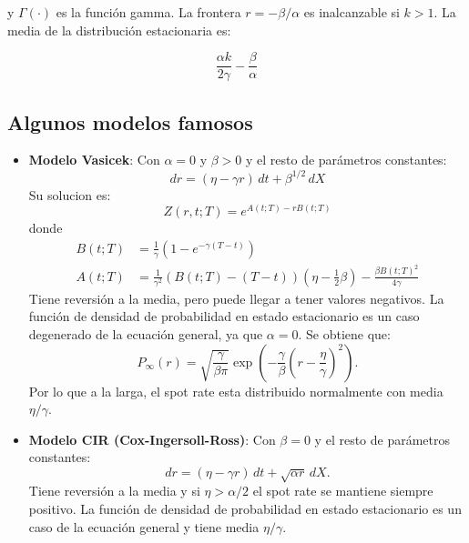 y $\Gamma(\cdot)$ es la función gamma. La frontera $r = -\beta/\alpha$ es inalcanzable si $k > 1$. La media de la distribución estacionaria es:

\begin{equation*}
    \frac{\alpha k}{2\gamma} - \frac{\beta}{\alpha}
\end{equation*}






\subsection{Algunos modelos famosos}
\begin{itemize}
    \item \textbf{Modelo Vasicek}: Con $\alpha=0$ y $\beta>0$ y el resto de parámetros constantes:
    \begin{equation*}
        \boxed{dr = (\eta - \gamma r)\,dt + \beta^{1/2}\,dX}
    \end{equation*}
    Su solucion es:
    \begin{equation*}
        Z(r, t; T) = e^{A(t;T) - r B(t;T)}
    \end{equation*}
    donde
    \begin{align*}
        B(t;T) &= \frac{1}{\gamma} \left( 1 - e^{-\gamma (T-t)} \right) \\
        A(t;T) &= \frac{1}{\gamma^2} \left( B(t;T) - (T-t) \right) \left( \eta - \frac{1}{2} \beta \right) - \frac{\beta B(t;T)^2}{4\gamma}
    \end{align*}
    Tiene reversión a la media, pero puede llegar a tener valores negativos. La función de densidad de probabilidad en estado estacionario es un caso degenerado de la ecuación general, ya que $\alpha = 0$. Se obtiene que:
    \begin{equation*}
        P_\infty(r) = \sqrt{\frac{\gamma}{\beta \pi}} \exp\left( -\frac{\gamma}{\beta} (r - \frac{\eta}{\gamma})^2 \right).
    \end{equation*}
    Por lo que a la larga, el spot rate esta distribuido normalmente con media $\eta/\gamma$.

    \item \textbf{Modelo CIR (Cox-Ingersoll-Ross)}: Con $\beta=0$ y el resto de parámetros constantes:
    \begin{equation*}
        \boxed{dr = (\eta - \gamma r)\,dt + \sqrt{\alpha r}\,dX.}
    \end{equation*}
    Tiene reversión a la media y si $\eta > \alpha/2$ el spot rate se mantiene siempre positivo. La función de densidad de probabilidad en estado estacionario es un caso de la ecuación general y tiene media $\eta/\gamma$.
    

\end{itemize}
